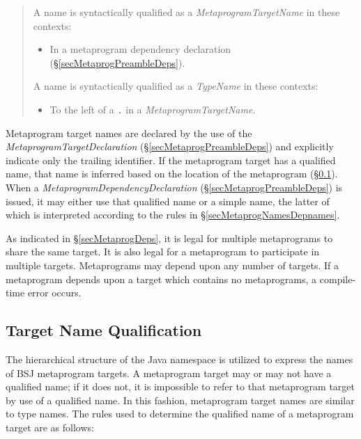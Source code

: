 \documentclass[a4paper,10pt]{report}
\newcommand{\refS}[1]{\hyperref[#1]{\S\ref{#1}}}
\begin{document}
\begin{quote}
    A name is syntactically qualified as a \textit{MetaprogramTargetName} in these contexts:
    \begin{itemize}
        \item In a metaprogram dependency declaration (\refS{secMetaprogPreambleDeps}).
    \end{itemize}
    
    A name is syntactically qualified as a \textit{TypeName} in these contexts:
    \begin{itemize}
        \item To the left of a \verb`.` in a \textit{MetaprogramTargetName}.
    \end{itemize}
\end{quote}

Metaprogram target names are declared by the use of the \textit{MetaprogramTargetDeclaration} (\refS{secMetaprogPreambleDeps}) and explicitly indicate only the trailing identifier.  If the metaprogram target has a qualified name, that name is inferred based on the location of the metaprogram (\refS{secMetaprogNamesQual}).  When a \textit{MetaprogramDependencyDeclaration} (\refS{secMetaprogPreambleDeps}) is issued, it may either use that qualified name or a simple name, the latter of which is interpreted according to the rules in \refS{secMetaprogNamesDepnames}.

As indicated in \refS{secMetaprogDeps}, it is legal for multiple metaprograms to share the same target.  It is also legal for a metaprogram to participate in multiple targets.  Metaprograms may depend upon any number of targets.  If a metaprogram depends upon a target which contains no metaprograms, a compile-time error occurs.

\subsection{Target Name Qualification}
\label{secMetaprogNamesQual}

The hierarchical structure of the Java namespace is utilized to express the names of BSJ metaprogram targets.  A metaprogram target may or may not have a qualified name; if it does not, it is impossible to refer to that metaprogram target by use of a qualified name.  In this fashion, metaprogram target names are similar to type names.  The rules used to determine the qualified name of a metaprogram target are as follows:
\end{document}
